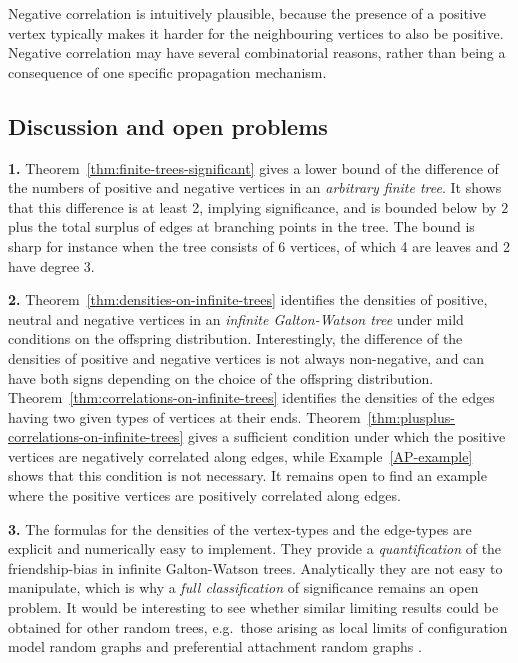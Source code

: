 \documentclass[11pt]{article}
\numberwithin{equation}{section}
\theoremstyle{plain}
\begin{document}
Negative correlation is intuitively plausible, because the presence of a positive vertex typically makes it harder for the neighbouring vertices to also be positive. Negative correlation may have several combinatorial reasons, rather than being a consequence of one specific propagation mechanism. 




\subsection{Discussion and open problems}
\label{sec:DiscPro}

\medskip\noindent
{\bf 1.} 
Theorem~\ref{thm:finite-trees-significant} gives a lower bound of the difference of the numbers of positive and negative vertices in an \emph{arbitrary finite tree}. It shows that this difference is at least 2, implying significance, and is bounded below by $2$ plus the total surplus of edges at branching points in the tree. The bound is sharp for instance when the tree consists of 6 vertices, of which 4 are leaves and 2 have degree 3. 

\medskip\noindent
{\bf 2.}
Theorem~\ref{thm:densities-on-infinite-trees} identifies the densities of positive, neutral and negative vertices in an \emph{infinite Galton-Watson tree} under mild conditions on the offspring distribution. Interestingly, the difference of the densities of positive and negative vertices is not always non-negative, and can have both signs depending on the choice of the offspring distribution. Theorem~\ref{thm:correlations-on-infinite-trees} identifies the densities of the edges having two given types of vertices at their ends. Theorem~\ref{thm:plusplus-correlations-on-infinite-trees} gives a sufficient condition under which the positive vertices are negatively correlated along edges, while Example~\ref{AP-example} shows that this condition is not necessary. It remains open to find an example   where the positive vertices are positively correlated along edges. 

\medskip\noindent
{\bf 3.} 
The formulas for the densities of the vertex-types and the edge-types are explicit and numerically easy to implement. They provide a \emph{quantification} of the friendship-bias in infinite Galton-Watson trees. Analytically they are not easy to manipulate, which is why a \emph{full classification} of significance remains an open problem. It would be interesting to see whether similar limiting results could be obtained for other random trees, e.g.\ those arising as local limits of configuration model random graphs and preferential attachment random graphs \cite[Chapters 7--8]{vdH1}.
\end{document}
